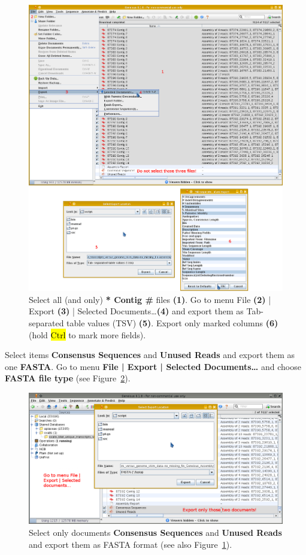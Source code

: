 \documentclass[a4paper, 11pt, twoside]{article}
\renewcommand{\texttt}[1]{\hl{\ttfamily #1}}
\begin{document}
\begin{figure}[p]
  \includegraphics[width=\textwidth]{geneious3.png}
  \caption[Export of contigs as TSV from Geneious]{Select all (and only) \textbf{* Contig \#} files \textbf{(1)}. Go to menu File \textbf{(2)} | Export \textbf{(3)} | Selected Documents\ldots \textbf{(4)} and export them as Tab-separated table values (TSV) \textbf{(5)}. Export only marked columns \textbf{(6)} (hold \texttt{Ctrl} to mark more fields).}
  \label{geneious-export1}
\end{figure}

Select items \textbf{Consensus Sequences} and \textbf{Unused Reads} and export them as one \textbf{FASTA}. Go to menu \textbf{File | Export | Selected Documents\ldots} and choose \textbf{FASTA file type} (see Figure~\ref{geneious-export2}).

\begin{figure}[htb]
  \includegraphics[width=\textwidth]{geneious4.png}
  \caption[Export of FASTA from Geneious]{ Select only documents \textbf{Consensus Sequences} and \textbf{Unused Reads} and export them as FASTA format (see also Figure~\ref{geneious-export1}).}
  \label{geneious-export2}
\end{figure}
\end{document}

